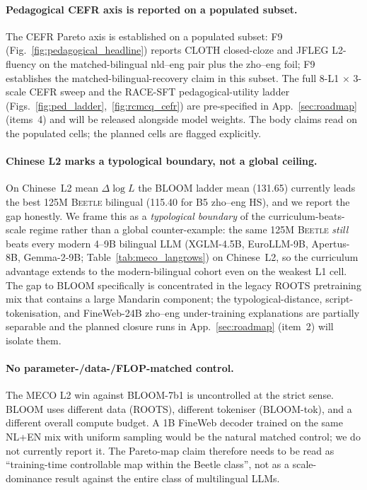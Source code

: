 \documentclass[11pt]{article}
\begin{document}
\paragraph{Pedagogical CEFR axis is reported on a populated subset.} The CEFR Pareto axis is established on a populated subset: F9 (Fig.~\ref{fig:pedagogical_headline}) reports CLOTH closed-cloze and JFLEG L2-fluency on the matched-bilingual nld--eng pair plus the zho--eng foil; F9 establishes the matched-bilingual-recovery claim in this subset. The full 8-L1 $\times$ 3-scale CEFR sweep and the RACE-SFT pedagogical-utility ladder (Figs.~\ref{fig:ped_ladder},~\ref{fig:rcmcq_cefr}) are pre-specified in App.~\ref{sec:roadmap} (items~4) and will be released alongside model weights. The body claims read on the populated cells; the planned cells are flagged explicitly.

\paragraph{Chinese L2 marks a typological boundary, not a global ceiling.} On Chinese~L2 mean $\Delta\log L$ the BLOOM ladder mean (131.65) currently leads the best 125M \textsc{Beetle} bilingual (115.40 for B5 zho--eng HS), and we report the gap honestly. We frame this as a \emph{typological boundary} of the curriculum-beats-scale regime rather than a global counter-example: the same 125M \textsc{Beetle} \emph{still} beats every modern 4--9B bilingual LLM (XGLM-4.5B, EuroLLM-9B, Apertus-8B, Gemma-2-9B; Table~\ref{tab:meco_langrows}) on Chinese~L2, so the curriculum advantage extends to the modern-bilingual cohort even on the weakest L1 cell. The gap to BLOOM specifically is concentrated in the legacy ROOTS pretraining mix that contains a large Mandarin component; the typological-distance, script-tokenisation, and FineWeb-24B zho--eng under-training explanations are partially separable and the planned closure runs in App.~\ref{sec:roadmap} (item~2) will isolate them.

\paragraph{No parameter-/data-/FLOP-matched control.} The MECO L2 win against BLOOM-7b1 is uncontrolled at the strict sense. BLOOM uses different data (ROOTS), different tokeniser (BLOOM-tok), and a different overall compute budget. A 1B FineWeb decoder trained on the same NL+EN mix with uniform sampling would be the natural matched control; we do not currently report it. The Pareto-map claim therefore needs to be read as ``training-time controllable map within the Beetle class'', not as a scale-dominance result against the entire class of multilingual LLMs.
\end{document}

